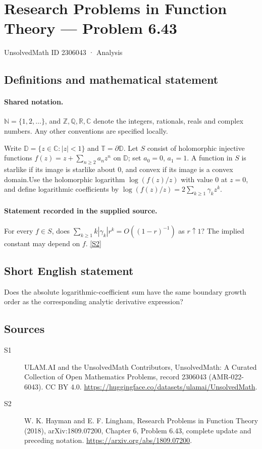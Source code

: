 \documentclass[11pt]{article}
\newcommand{\sref}[2]{\hyperlink{source:#1:#2}{[S#2]}}
\begin{document}
\setcounter{section}{2306042}
\section{Research Problems in Function Theory — Problem 6.43}\label{2306043}
{\small\sffamily UnsolvedMath ID 2306043 · Analysis}
\subsection{Definitions and mathematical statement}

\paragraph{Shared notation.}$\mathbb N=\{1,2,\ldots\}$, and $\mathbb Z,\mathbb Q,\mathbb R,\mathbb C$ denote the integers, rationals, reals and complex numbers. Any other conventions are specified locally.


Write $\mathbb D=\{z\in\mathbb C:|z|<1\}$ and $\mathbb T=\partial\mathbb D$. Let $S$ consist of holomorphic injective functions $f(z)=z+\sum_{n\ge2}a_nz^n$ on $\mathbb D$; set $a_0=0$, $a_1=1$. A function in $S$ is starlike if its image is starlike about $0$, and convex if its image is a convex domain.Use the holomorphic logarithm $\log(f(z)/z)$ with value $0$ at $z=0$, and define logarithmic coefficients by $\log(f(z)/z)=2\sum_{k\ge1}\gamma_kz^k$.
\paragraph{Statement recorded in the supplied source.}
For every $f\in S$, does $\sum_{k\ge1}k|\gamma_k|r^k=O((1-r)^{-1})$ as $r\uparrow1$? The implied constant may depend on $f$. \sref{2306043}{2}
\subsection{Short English statement}
Does the absolute logarithmic-coefficient sum have the same boundary growth order as the corresponding analytic derivative expression?
\subsection{Sources}
\begin{description}
\item[\hypertarget{source:2306043:1}{S1}] ULAM.AI and the UnsolvedMath Contributors, UnsolvedMath: A Curated Collection of Open Mathematics Problems, record 2306043 (AMR-022-6043). CC BY 4.0. \url{https://huggingface.co/datasets/ulamai/UnsolvedMath}.
\item[\hypertarget{source:2306043:2}{S2}] W. K. Hayman and E. F. Lingham, Research Problems in Function Theory (2018), arXiv:1809.07200, Chapter 6, Problem 6.43, complete update and preceding notation. \url{https://arxiv.org/abs/1809.07200}.
\end{description}
\label{end:2306043}
\end{document}
